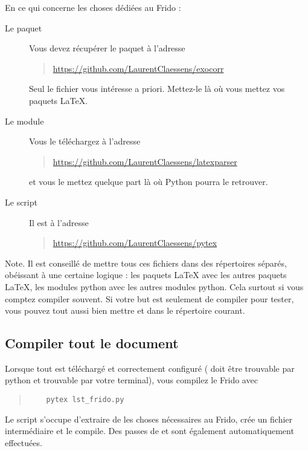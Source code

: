 En ce qui concerne les choses dédiées au Frido :
\begin{description}
    \item[Le paquet ]
        Vous devez récupérer le paquet  à l'adresse
        \begin{quote}
            \url{https://github.com/LaurentClaessens/exocorr}
        \end{quote}
        Seul le fichier  vous intéresse a priori. Mettez-le là où vous mettez vos paquets \LaTeX{}.
    \item[Le module ]
        Vous le téléchargez à l'adresse
        \begin{quote}
            \url{https://github.com/LaurentClaessens/latexparser}
        \end{quote}
        et vous le mettez quelque part là où Python pourra le retrouver.
    \item[Le script ]
        Il est à l'adresse
        \begin{quote}
            \url{https://github.com/LaurentClaessens/pytex}
        \end{quote}
\end{description}

Note. Il est conseillé de mettre tous ces fichiers dans des répertoires séparés, obéissant à une certaine logique : les paquets \LaTeX{} avec les autres paquets \LaTeX{}, les modules python avec les autres modules python. Cela surtout si vous comptez compiler souvent. Si votre but est seulement de compiler pour tester, vous pouvez tout aussi bien mettre  et  dans le répertoire courant.

\subsection{Compiler tout le document}

Lorsque tout est téléchargé et correctement configuré ( doit être trouvable par python et  trouvable par votre terminal), vous compilez le Frido avec
\begin{quote}
    \begin{verbatim}
    pytex lst_frido.py
    \end{verbatim}
\end{quote}
Le script s'occupe d'extraire de  les choses nécessaires au Frido, crée un fichier intermédiaire et le compile. Des passes de  et  sont également automatiquement effectuées.

